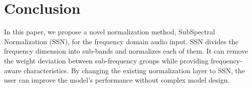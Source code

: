 \documentclass{article}
\begin{document}
\section{Conclusion}
\label{sec:conclusion}
In this paper, we propose a novel normalization method, SubSpectral Normalization (SSN), for the frequency domain audio input.  
SSN divides the frequency dimension into sub-bands and normalizes each of them. 
It can remove the weight deviation between sub-frequency groups while providing frequency-aware characteristics.
By changing the existing normalization layer to SSN, the user can improve the model's performance without complex model design.

\vfill\pagebreak



\end{document}
